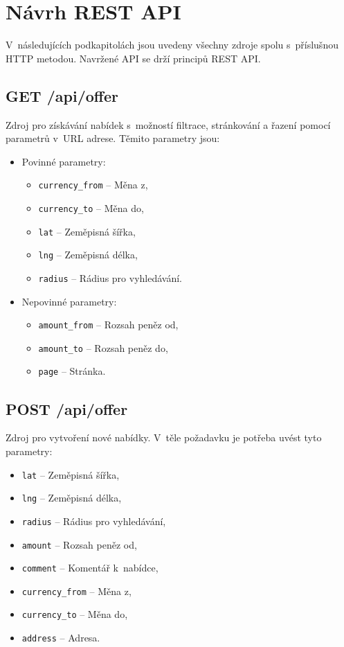\pagebreak
\section{Návrh REST API}\label{rest-api-design}
V~následujících podkapitolách jsou uvedeny všechny zdroje spolu s~příslušnou HTTP metodou. Navržené API se drží principů REST API.

\subsection{GET /api/offer}
Zdroj pro získávání nabídek s~možností filtrace, stránkování a řazení pomocí parametrů v~URL adrese. Těmito parametry jsou:
\begin{itemize}
    \item Povinné parametry:
    \begin{itemize}
        \item \texttt{currency\_from} -- Měna z,
        \item \texttt{currency\_to} -- Měna do,
        \item \texttt{lat} -- Zeměpisná šířka,
        \item \texttt{lng} -- Zeměpisná délka,
        \item \texttt{radius} -- Rádius pro vyhledávání.
    \end{itemize}
    \item Nepovinné parametry:
    \begin{itemize}
        \item \texttt{amount\_from} -- Rozsah peněz od,
        \item \texttt{amount\_to} -- Rozsah peněz do,
        \item \texttt{page} -- Stránka.
    \end{itemize}
\end{itemize}

\subsection{POST /api/offer}
Zdroj pro vytvoření nové nabídky. V~těle požadavku je potřeba uvést tyto parametry:
\begin{itemize}
    \item \texttt{lat} -- Zeměpisná šířka,
    \item \texttt{lng} -- Zeměpisná délka,
    \item \texttt{radius} -- Rádius pro vyhledávání,
    \item \texttt{amount} -- Rozsah peněz od,
    \item \texttt{comment} -- Komentář k~nabídce,
    \item \texttt{currency\_from} -- Měna z,
    \item \texttt{currency\_to} -- Měna do,
    \item \texttt{address} -- Adresa.
\end{itemize}

